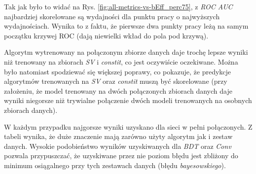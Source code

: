 Tak jak było to widać na Rys. \ref{fig:all-metrics-vs-bEff_perc75}, z \textit{ROC AUC} najbardziej skorelowane są wydajności dla punktu pracy o najwyższych wydajnościach. Wynika to z faktu, że pierwsze dwa punkty pracy leżą na samym początku krzywej ROC (dają niewielki wkład do pola pod krzywą).

Algorytm wytrenowany na połączonym zbiorze danych daje trochę lepsze wyniki niż trenowany na zbiorach \textit{SV} i \textit{constit}, co jest oczywiście oczekiwane. Można było natomiast spodziewać się większej poprawy, co pokazuje, że predykcje algorytmów trenowanych na \textit{SV} oraz \textit{constit} muszą być skorelowane (przy założeniu, że model trenowany na dwóch połączonych zbiorach danych daje wyniki niegorsze niż trywialne połączenie dwóch modeli trenowanych na osobnych zbiorach danych).

W każdym przypadku najgorsze wyniki uzyskano dla sieci w pełni połączonych.
Z tabeli wynika, że duże znaczenie mają zarówno użyty algorytm jak i zestaw danych.
Wysokie podobieństwo wyników uzyskiwanych dla \textit{BDT} oraz \textit{Conv} pozwala przypuszczać, że uzyskiwane przez nie poziom błędu jest zbliżony do minimum osiągalnego przy tych zestawach danych (błędu \textit{bayesowskiego}).



